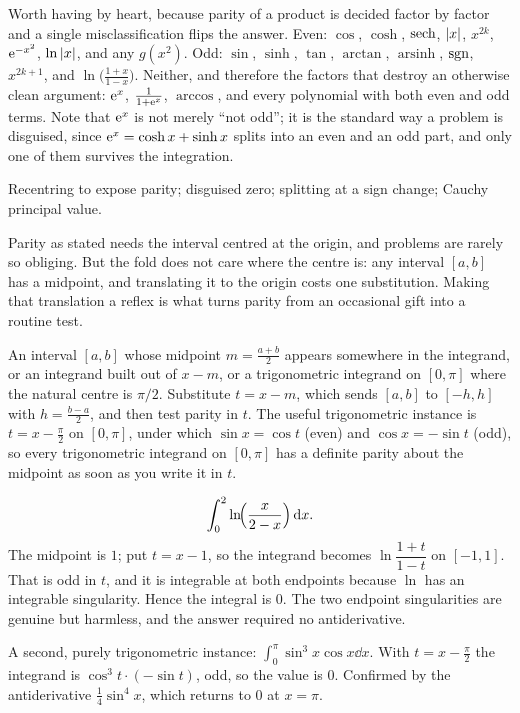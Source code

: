 \begin{keynote}
Worth having by heart, because parity of a product is decided factor by factor and a single misclassification flips the answer. Even: $\cos$, $\cosh$, $\operatorname{sech}$, $\left\lvert x\right\rvert$, $x^{2k}$, $\mathrm{e}^{-x^{2}}$, $\ln\left\lvert x\right\rvert$, and any $g(x^{2})$. Odd: $\sin$, $\sinh$, $\tan$, $\arctan$, $\operatorname{arsinh}$, $\operatorname{sgn}$, $x^{2k+1}$, and $\ln\bigl(\tfrac{1+x}{1-x}\bigr)$. Neither, and therefore the factors that destroy an otherwise clean argument: $\mathrm{e}^{x}$, $\tfrac{1}{1+\mathrm{e}^{x}}$, $\arccos$, and every polynomial with both even and odd terms. Note that $\mathrm{e}^{x}$ is not merely ``not odd''; it is the standard way a problem is disguised, since $\mathrm{e}^{x}=\cosh x+\sinh x$ splits into an even and an odd part, and only one of them survives the integration.
\end{keynote}

\begin{seealsob}Recentring to expose parity; disguised zero; splitting at a sign change; Cauchy principal value.\end{seealsob}

Parity as stated needs the interval centred at the origin, and problems are rarely so obliging. But the fold does not care where the centre is: any interval $[a,b]$ has a midpoint, and translating it to the origin costs one substitution. Making that translation a reflex is what turns parity from an occasional gift into a routine test.

\cue An interval $[a,b]$ whose midpoint $m=\tfrac{a+b}{2}$ appears somewhere in the integrand, or an integrand built out of $x-m$, or a trigonometric integrand on $[0,\pi]$ where the natural centre is $\pi/2$.
\method Substitute $t=x-m$, which sends $[a,b]$ to $[-h,h]$ with $h=\tfrac{b-a}{2}$, and then test parity in $t$. The useful trigonometric instance is $t=x-\tfrac{\pi}{2}$ on $[0,\pi]$, under which $\sin x=\cos t$ (even) and $\cos x=-\sin t$ (odd), so every trigonometric integrand on $[0,\pi]$ has a definite parity about the midpoint as soon as you write it in $t$.

\begin{worked}
\[\int_0^{2}\ln\!\Bigl(\frac{x}{2-x}\Bigr)\,\mathrm{d} x.\]
The midpoint is $1$; put $t=x-1$, so the integrand becomes $\ln\dfrac{1+t}{1-t}$ on $[-1,1]$. That is odd in $t$, and it is integrable at both endpoints because $\ln$ has an integrable singularity. Hence the integral is $0$. The two endpoint singularities are genuine but harmless, and the answer required no antiderivative.

A second, purely trigonometric instance: $\int_0^{\pi}\sin^{3}x\cos x\dd x$. With $t=x-\tfrac{\pi}{2}$ the integrand is $\cos^{3}t\cdot(-\sin t)$, odd, so the value is $0$. Confirmed by the antiderivative $\tfrac14\sin^{4}x$, which returns to $0$ at $x=\pi$.
\end{worked}

